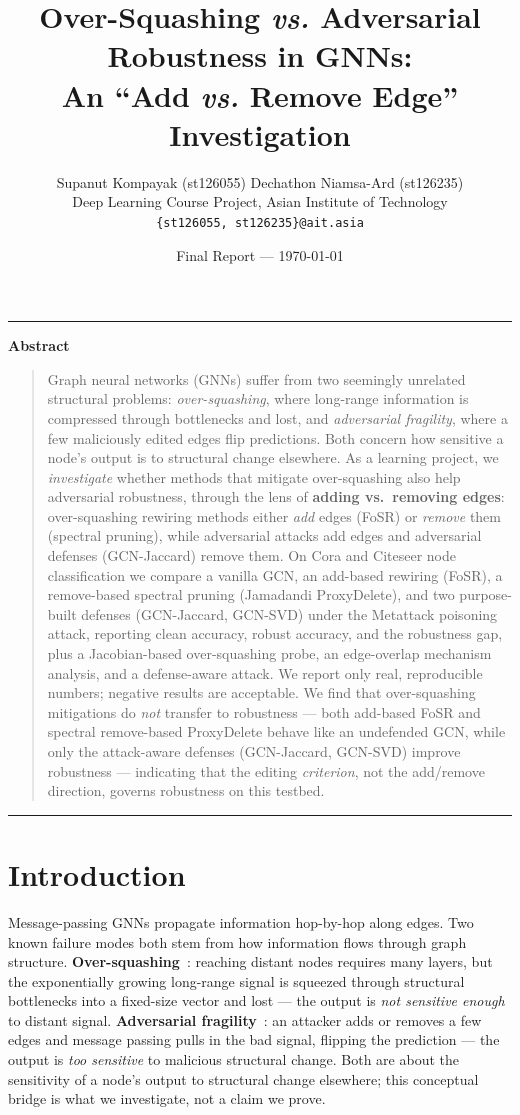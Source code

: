 \documentclass[10pt]{article}
\title{\textbf{Over-Squashing {\itshape vs.} Adversarial Robustness in GNNs:\\
An ``Add {\itshape vs.} Remove Edge'' Investigation}}
\author{
  Supanut Kompayak (st126055) \quad Dechathon Niamsa-Ard (st126235)\\
  Deep Learning Course Project, Asian Institute of Technology\\
  \texttt{\{st126055, st126235\}@ait.asia}
}
\date{Final Report --- \today}
\renewenvironment{abstract}{%
  \vspace{0.5em}\begin{center}\rule{\textwidth}{0.5pt}\end{center}\vspace{-0.3em}
  {\centering\textbf{Abstract}\par}\vspace{0.3em}
  \begin{quote}\small}{%
  \end{quote}\vspace{-0.3em}\begin{center}\rule{\textwidth}{0.5pt}\end{center}}
\begin{document}
\maketitle

\begin{abstract}
Graph neural networks (GNNs) suffer from two seemingly unrelated structural problems: \emph{over-squashing},
where long-range information is compressed through bottlenecks and lost, and \emph{adversarial fragility},
where a few maliciously edited edges flip predictions. Both concern how sensitive a node's output is to
structural change elsewhere. As a learning project, we \emph{investigate} whether methods that mitigate
over-squashing also help adversarial robustness, through the lens of \textbf{adding vs.\ removing edges}:
over-squashing rewiring methods either \emph{add} edges (FoSR) or \emph{remove} them (spectral pruning),
while adversarial attacks add edges and adversarial defenses (GCN-Jaccard) remove them. On Cora and
Citeseer node classification we compare a vanilla GCN, an add-based rewiring (FoSR), a remove-based
spectral pruning (Jamadandi ProxyDelete), and two purpose-built defenses (GCN-Jaccard, GCN-SVD) under the
Metattack poisoning attack, reporting clean accuracy, robust accuracy, and the robustness gap, plus a
Jacobian-based over-squashing probe, an edge-overlap mechanism analysis, and a defense-aware attack. We
report only real, reproducible numbers; negative results are acceptable. We find that over-squashing
mitigations do \emph{not} transfer to robustness --- both add-based FoSR and spectral remove-based
ProxyDelete behave like an undefended GCN, while only the attack-aware defenses (GCN-Jaccard, GCN-SVD)
improve robustness --- indicating that the editing \emph{criterion}, not the add/remove direction,
governs robustness on this testbed.

\end{abstract}

\section{Introduction}
Message-passing GNNs propagate information hop-by-hop along edges. Two known failure modes both stem from
how information flows through graph structure. \textbf{Over-squashing}~\citep{alon2021bottleneck,
topping2022understanding,digiovanni2023oversquashing}: reaching distant nodes requires many layers, but the
exponentially growing long-range signal is squeezed through structural bottlenecks into a fixed-size vector
and lost --- the output is \emph{not sensitive enough} to distant signal. \textbf{Adversarial
fragility}~\citep{zugner2019metattack,zugner2018nettack}: an attacker adds or removes a few edges and message
passing pulls in the bad signal, flipping the prediction --- the output is \emph{too sensitive} to malicious
structural change. Both are about the sensitivity of a node's output to structural change elsewhere; this
conceptual bridge is what we investigate, not a claim we prove.
\end{document}
